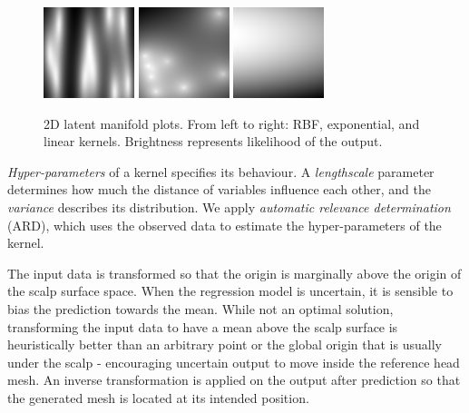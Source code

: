 \documentclass[ %
author={Dillon Keith Diep},
supervisor={Dr. Carl Henrik Ek},
degree={MEng},
title={ART-CG Hair:},
subtitle={Assisted Real-time Content Generation of Stylised Virtual Hair},
type={Research},
year={2017} ]{dissertation}
\begin{document}
\begin{figure}[!h]
	\centering
	\caption{2D latent manifold plots. From left to right: RBF, exponential, and linear kernels. Brightness represents likelihood of the output.}
	\includegraphics[scale=1]{images/latentPlot_t10}
	\includegraphics[scale=1]{images/latentPlot_exp}
	\includegraphics[scale=1]{images/latentPlot_linear}
\end{figure}

\textit{Hyper-parameters} of a kernel specifies its behaviour. A \textit{lengthscale} parameter determines how much the distance of variables influence each other, and the \textit{variance} describes its distribution. We apply \textit{automatic relevance determination} (ARD), which uses the observed data to estimate the hyper-parameters of the kernel.

The input data is transformed so that the origin is marginally above the origin of the scalp surface space. When the regression model is uncertain, it is sensible to bias the prediction towards the mean. While not an optimal solution, transforming the input data to have a mean above the scalp surface is heuristically better than an arbitrary point or the global origin that is usually under the scalp - encouraging uncertain output to move inside the reference head mesh. An inverse transformation is applied on the output after prediction so that the generated mesh is located at its intended position. 
\end{document}
